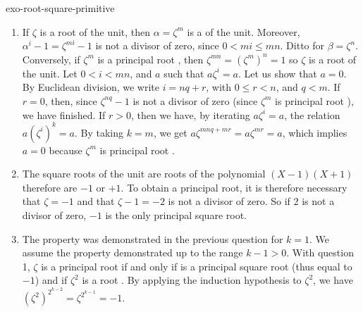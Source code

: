  
\begin{correction}{exo-root-square-primitive}
\begin{enumerate}
\item {} If $ \zeta $ is a  root of the unit, then $ \alpha = \zeta^m $ is a  of the unit. Moreover, $ \alpha^i-1 = \zeta^{mi}-1 $ is not a divisor of zero, since $ 0 <mi \leq mn $. Ditto for $ \beta = \zeta^n $. \\Conversely, if $ \zeta^m $ is a principal root , then $ \zeta^{mn} = (\zeta^m )^n = 1 $ so $ \zeta $ is a  root of the unit. Let $ 0 <i <mn $, and $ a $ such that $ a \zeta^i = a $. Let us show that $ a = 0 $. By Euclidean division, we write $ i = nq + r $, with $ 0 \leq r <n $, and $ q <m $. If $ r = 0 $, then, since $ \zeta^{nq}-1 $ is not a divisor of zero (since $ \zeta^m $ is principal root ), we have finished. If $ r> 0 $, then we have, by iterating $ a \zeta^i = a $, the relation $ a (\zeta^i)^k = a $. By taking $ k = m $, we get $ a \zeta^{mnq + mr} = a \zeta^{mr} = a $, which implies $ a = 0 $ because $ \zeta^m $ is principal root .
\item The square roots of the unit are roots of the polynomial $ (X-1) (X+1) $ therefore are $ -1 $ or $+1 $. To obtain a principal root, it is therefore necessary that $ \zeta = -1 $ and that $ \zeta-1 = -2 $ is not a divisor of zero. So if $ 2 $ is not a divisor of zero, $ -1 $ is the only principal square root.
\item The property was demonstrated in the previous question for $ k = 1 $. We assume the property demonstrated up to the range $ k-1> 0 $. With question 1, $ \zeta $ is a  principal root if and only if  is a principal square root (thus equal to $ -1 $) and if $ \zeta^2 $ is a root . By applying the induction hypothesis to $ \zeta^2 $, we have $ (\zeta^2)^{2^{k-2}} = \zeta^{2^{k-1}} = -1 $.
\end{enumerate}
\end{correction}
 
